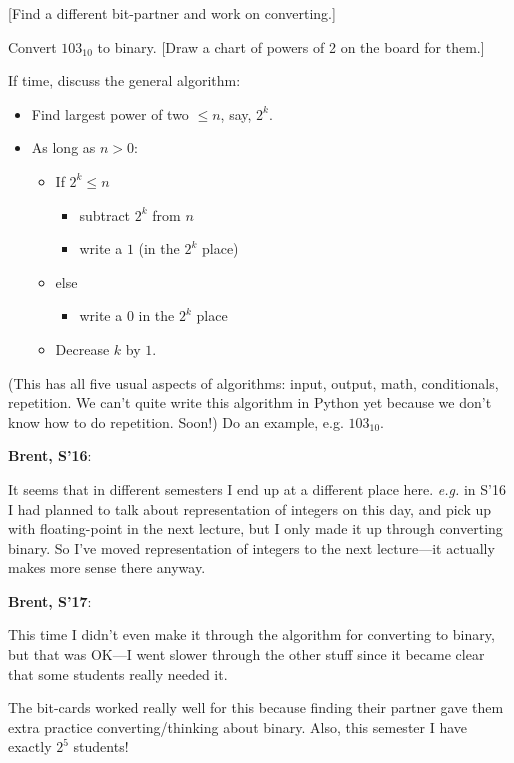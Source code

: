 \documentclass{article}
\newenvironment{reflect}[1]
{
  \noindent
  \begin{lrbox}{\reflectbox}
    \begin{minipage}[t]{\textwidth}
      \textbf{#1}:
}{
    \end{minipage}
  \end{lrbox}
  \fbox{\usebox{\reflectbox}}
}
\begin{document}
[Find a different bit-partner and work on converting.]

Convert $103_{10}$ to binary.  [Draw a chart of powers of 2 on the
board for them.]

If time, discuss the general algorithm:

\begin{itemize}
\item Find largest power of two $\leq n$, say, $2^k$.
\item As long as $n > 0$:
  \begin{itemize}
  \item If $2^k \leq n$
    \begin{itemize}
    \item subtract $2^k$ from $n$
    \item write a $1$ (in the $2^k$ place)
    \end{itemize}
  \item else
    \begin{itemize}
    \item  write a $0$ in the $2^k$ place
    \end{itemize}
  \item Decrease $k$ by $1$.
  \end{itemize}
\end{itemize}

(This has all five usual aspects of algorithms: input, output, math,
conditionals, repetition.  We can't quite write this algorithm in
Python yet because we don't know how to do repetition.  Soon!)  Do an
example, e.g. $103_{10}$.

\begin{reflect}{Brent, S'16}
  It seems that in different semesters I end up at a different place
  here. \emph{e.g.} in S'16 I had planned to talk about representation
  of integers on this day, and pick up with floating-point in the next
  lecture, but I only made it up through converting binary. So I've moved
  representation of integers to the next lecture---it actually makes
  more sense there anyway.
\end{reflect}

\begin{reflect}{Brent, S'17}
  This time I didn't even make it through the algorithm for converting
  to binary, but that was OK---I went slower through the other stuff
  since it became clear that some students really needed it.

  The bit-cards worked really well for this because finding their
  partner gave them extra practice converting/thinking about binary.
  Also, this semester I have exactly $2^5$ students!
\end{reflect}
\end{document}

